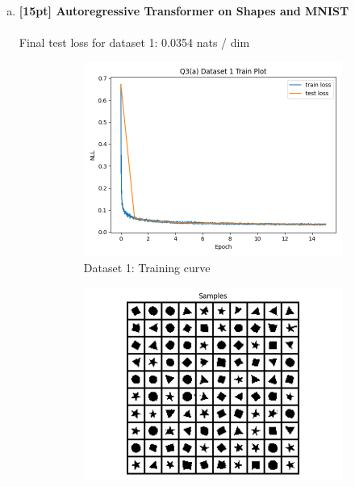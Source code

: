 \documentclass{article}
\begin{document}
\newpage
{}

\begin{enumerate}[(a)]
\item {\bf [15pt] Autoregressive Transformer on Shapes and MNIST} \\\\
Final test loss for dataset 1: 0.0354 nats / dim
\begin{figure}[H]
    \centering
    \begin{subfigure}{0.45\textwidth}
        \centering
        \includegraphics[width=\textwidth]{figures/q3_a_dset1_train_plot.png}
        \caption{Dataset 1: Training curve}
    \end{subfigure}
    \hspace{0.2in}
    \begin{subfigure}{0.45\textwidth}
        \centering
        \includegraphics[width=\textwidth]{figures/q3_a_dset1_samples.png}

\end{subfigure}
\end{figure}
\end{enumerate}
\end{document}
